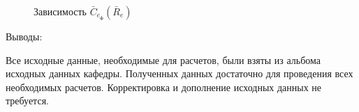 \begin{figure}[H]
    \caption{Зависимость $\bar{C}_{e_\text{ф}}(\bar{R}_e)$}
    \label{fig:Ce}
\end{figure}

\begin{center}
    Выводы:
\end{center}

Все исходные данные, необходимые для расчетов, были взяты из
альбома исходных данных кафедры. Полученных данных достаточно для проведения всех необходимых расчетов. Корректировка и дополнение исходных данных не требуется.


